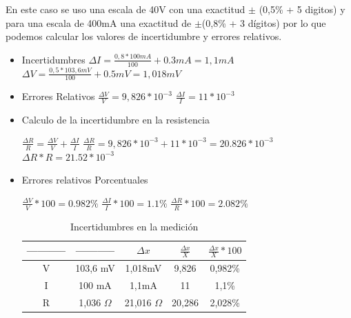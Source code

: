 \documentclass[12pt, letterpaper]{article}
\begin{document}
En este caso se uso una escala de  40V con una exactitud $\pm$ (0,5\% + 5 digitos) y para una escala de 400mA una exactitud de $\pm$(0,8\% + 3 dígitos)
por lo que podemos calcular los valores de incertidumbre y errores relativos.
\singlespacing  
\begin{itemize}
\item  Incertidumbres
\singlespacing
$\Delta I= \frac{0,8 * 100mA}{100}+0.3mA=1,1mA$\singlespacing
$\Delta V= \frac{0,5 * 103,6mV}{100}+0.5mV=1,018mV$\singlespacing
\item Errores Relativos\singlespacing
$\frac{\Delta V}{V} = 9,826*10^{-3}$\singlespacing
$\frac{\Delta I}{I} = 11*10^{-3}$ \singlespacing
\item Calculo de la incertidumbre en la resistencia\singlespacing

$\frac{\Delta R}{R} = \frac{\Delta V}{V} + \frac{\Delta I}{I}$ \singlespacing
$\frac{\Delta R}{R} = 9,826*10^{-3}+11*10^{-3}=20.826*10^{-3}$ \singlespacing
$\Delta R * R = 21.52*10^{-3}$\singlespacing

\item Errores relativos Porcentuales\singlespacing

$\frac{\Delta V}{V} * 100 = 0.982\%$\singlespacing
$\frac{\Delta I}{I} * 100 = 1.1\%$\singlespacing
$\frac{\Delta R}{R} * 100 = 2.082\%$\singlespacing
 
\begin{table}[H]
\centering

	\begin{tabular}{|c|c|c|c|c|}
    	\hline
    	----------- & ----------- & $\Delta x$  & $\frac{\Delta x}{X}$  & $\frac{\Delta x}{X} *100$ \\ \hline
    	V           & 103,6 mV    & 1,018mV & 9,826      & 0,982\%        \\ \hline
    	I           & 100 mA      & 1,1mA   & 11         & 1,1\%          \\ \hline
    	R           & 1,036    $\Omega$    & 21,016 $\Omega$  & 20,286     & 2,028\%        \\ \hline
	\end{tabular}
 
 \caption{Incertidumbres en la medición}
\end{table}
\end{itemize}
\singlespacing
\end{document}
